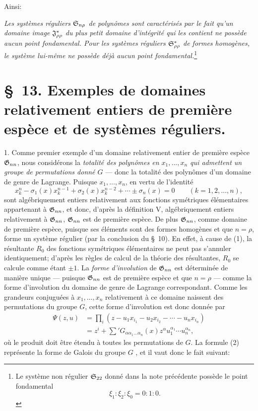 Ainsi:

\emph{Les systèmes réguliers $\mathfrak{S}_{n\rho}$ de polynômes sont caractérisés par le fait qu'un domaine image $\mathfrak{J}^*_{\rho\rho}$ du plus petit domaine d’intégrité qui les contient ne possède aucun point fondamental. Pour les systèmes réguliers $\mathfrak{S}^*_{\rho\rho}$ de formes homogènes, le système lui-même ne possède déjà aucun point fondamental.}\footnote{Le système non régulier $\mathfrak{S}_{22}$ donné dans la note précédente possède le point fondamental
\[
  \xi_1:\xi_2:\xi_0=0:1:0.
\]}

\section*{\S\ 13. Exemples de domaines relativement entiers de première espèce et de systèmes réguliers.}

1. Comme premier exemple d'un domaine relativement entier de première espèce $\mathfrak{G}_{nn}$, nous considérons la \emph{totalité des polynômes en $x_1,\ldots,x_n$ qui admettent un groupe de permutations donné $G$} --- donc la totalité des polynômes d'un domaine de genre de Lagrange. Puisque $x_1,\ldots,x_n$, en vertu de l'identité
\begin{equation}
  x_k^n-\sigma_1(x)x_k^{n-1}+\sigma_2(x)x_k^{n-2}+\cdots\pm\sigma_n(x)=0
  \qquad(k=1,2,
\ldots,n),
\tag{1}
\end{equation}
sont algébriquement entiers relativement aux fonctions symétriques élémentaires appartenant à $\mathfrak{G}_{nn}$, et donc, d'après la définition V, algébriquement entiers relativement à $\mathfrak{G}_{nn}$, $\mathfrak{G}_{nn}$ est de première espèce. De plus $\mathfrak{G}_{nn}$, comme domaine de première espèce, puisque ses éléments sont des formes homogènes et que $n=\rho$, forme un système régulier (par la conclusion du \S\ 10). En effet, à cause de (1), la résultante $R_0$ des fonctions symétriques élémentaires ne peut pas s'annuler identiquement; d'après les règles de calcul de la théorie des résultantes, $R_0$ se calcule comme étant $\pm1$. La \emph{forme d'involution} de $\mathfrak{G}_{nn}$ est déterminée de manière unique --- puisque $\mathfrak{G}_{nn}$ est de première espèce et que $n=\rho$ --- comme la forme d'involution du domaine de genre de Lagrange correspondant. Comme les grandeurs conjuguées à $x_1,\ldots,x_n$ relativement à ce domaine naissent des permutations du groupe $G$, cette forme d'involution est donc donnée par
\begin{equation}
\begin{aligned}
  \Psi(z,u)&=\prod_i
  (z-u_1x_{i_1}-u_2x_{i_2}-\cdots-u_nx_{i_n})\\
  &=z^i+\sum{}'G_{\alpha\alpha_1\ldots\alpha_n}(x)
  z^\alpha u_1^{\alpha_1}\cdots u_n^{\alpha_n},
\end{aligned}
\tag{2}
\end{equation}
où le produit doit être étendu à toutes les permutations de $G$. La formule (2) représente la \og{} forme de Galois du groupe $G$ \fg{}, et il vaut donc le fait suivant:

